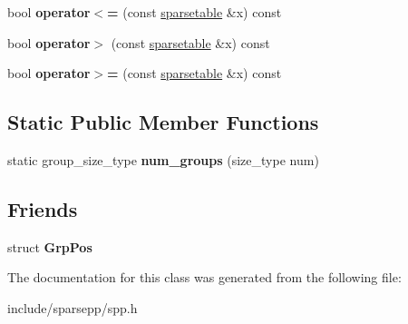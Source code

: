\begin{DoxyCompactItemize}
\item 
bool {\bfseries operator$<$=} (const \hyperlink{classspp___1_1sparsetable}{sparsetable} \&x) const \hypertarget{classspp___1_1sparsetable_ac69ea8a473c54593a09d38d1e3323fb1}{}\label{classspp___1_1sparsetable_ac69ea8a473c54593a09d38d1e3323fb1}

\item 
bool {\bfseries operator$>$} (const \hyperlink{classspp___1_1sparsetable}{sparsetable} \&x) const \hypertarget{classspp___1_1sparsetable_aa288c8dbfc2a2e8012bcc7b136ae59be}{}\label{classspp___1_1sparsetable_aa288c8dbfc2a2e8012bcc7b136ae59be}

\item 
bool {\bfseries operator$>$=} (const \hyperlink{classspp___1_1sparsetable}{sparsetable} \&x) const \hypertarget{classspp___1_1sparsetable_a3899a643fa922a45eefdd9acdbf90c58}{}\label{classspp___1_1sparsetable_a3899a643fa922a45eefdd9acdbf90c58}

\end{DoxyCompactItemize}
\subsection*{Static Public Member Functions}
\begin{DoxyCompactItemize}
\item 
static group\+\_\+size\+\_\+type {\bfseries num\+\_\+groups} (size\+\_\+type num)\hypertarget{classspp___1_1sparsetable_ae56656e1539cf1e25bf55992fcf9f91f}{}\label{classspp___1_1sparsetable_ae56656e1539cf1e25bf55992fcf9f91f}

\end{DoxyCompactItemize}
\subsection*{Friends}
\begin{DoxyCompactItemize}
\item 
struct {\bfseries Grp\+Pos}\hypertarget{classspp___1_1sparsetable_a17116e66b878f28940fcd02323805e6b}{}\label{classspp___1_1sparsetable_a17116e66b878f28940fcd02323805e6b}

\end{DoxyCompactItemize}


The documentation for this class was generated from the following file\+:\begin{DoxyCompactItemize}
\item 
include/sparsepp/spp.\+h\end{DoxyCompactItemize}
